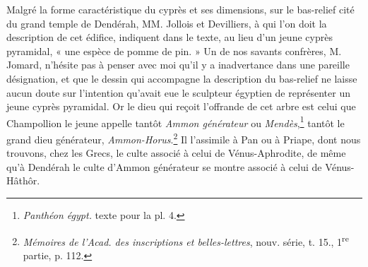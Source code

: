 \documentclass{article}
\begin{document}
Malgré la forme caractéristique du cyprès et ses dimensions, sur le bas-relief cité du grand temple de Dendérah, MM. Jollois et Devilliers, à qui l'on doit la description de cet édifice, indiquent dans le texte, au lieu d'un jeune cyprès pyramidal, « une espèce de pomme de pin. » Un de nos savants confrères, M. Jomard, n'hésite pas à penser avec moi qu'il y a inadvertance dans une pareille désignation, et que le dessin qui accompagne la description du bas-relief ne laisse aucun doute sur l'intention qu'avait eue le sculpteur égyptien de représenter un jeune cyprès pyramidal. Or le dieu qui reçoit l'offrande de cet arbre est celui que Champollion le jeune appelle tantôt \emph{Ammon générateur} ou \emph{Mendès},\footnote{\emph{Panthéon égypt.} texte pour la pl. 4.} tantôt le grand dieu générateur, \emph{Ammon-Horus}.\footnote{\emph{Mémoires de l'Acad. des inscriptions et belles-lettres}, nouv. série, t. 15., 1\textsuperscript{re} partie, p. 112.} Il l'assimile à Pan ou à Priape, dont nous trouvons, chez les Grecs, le culte associé à celui de Vénus-Aphrodite, de même qu'à Dendérah le culte d'Ammon générateur se montre associé à celui de Vénus-Hâthôr.
\end{document}
